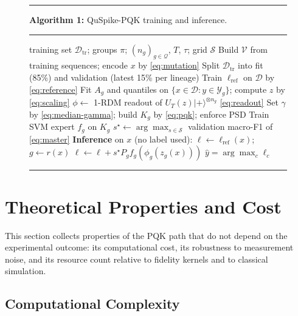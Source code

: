 \documentclass[conference]{IEEEtran}
\begin{document}
\begin{figure}[!t]
    \hrule\smallskip
    \noindent\textbf{Algorithm 1:} QuSpike-PQK training and inference.
    \smallskip\hrule\smallskip
    \footnotesize
    \begin{algorithmic}[1]
        \REQUIRE training set $\mathcal{D}_{\mathrm{tr}}$; groups $\pi$; $(n_g)_{g\in\mathcal{Q}}$, $T$, $\tau$; grid $\mathcal{S}$
        \STATE Build $\mathcal{V}$ from training sequences; encode $x$ by \eqref{eq:mutation}
        \STATE Split $\mathcal{D}_{\mathrm{tr}}$ into fit (85\%) and validation (latest 15\% per lineage)
            \STATE Train $\ell_{\mathrm{ref}}$ on $\mathcal{D}$ by \eqref{eq:reference}
                \STATE Fit $A_g$ and quantiles on $\{x\in\mathcal{D}:y\in\mathcal{Y}_g\}$; compute $z$ by \eqref{eq:scaling}
                \STATE $\phi\leftarrow$ 1-RDM readout of $U_T(z)|{+}\rangle^{\otimes n_g}$ \eqref{eq:readout} 
                \STATE Set $\gamma$ by \eqref{eq:median-gamma}; build $K_g$ by \eqref{eq:pqk}; enforce PSD
                \STATE Train SVM expert $f_g$ on $K_g$
            \ENDFOR
                \STATE $s^{\star}\leftarrow\arg\max_{s\in\mathcal{S}}$ validation macro-F1 of \eqref{eq:master}
            \ENDIF
        \ENDFOR
        \STATE \textbf{Inference} on $x$ (no label used): $\ell\leftarrow\ell_{\mathrm{ref}}(x)$; $g\leftarrow r(x)$
            \STATE $\ell\leftarrow\ell+s^{\star}P_g f_g(\phi_g(z_g(x)))$
        \ENDIF
        \RETURN $\hat{y}=\arg\max_c\ell_c$
    \end{algorithmic}
    \smallskip\hrule
\end{figure}

\section{Theoretical Properties and Cost}
\label{sec:theory}

This section collects properties of the PQK path that do not depend on the experimental outcome: its computational cost, its robustness to measurement noise, and its resource count relative to fidelity kernels and to classical simulation.

\subsection{Computational Complexity}
\label{sec:complexity}
\end{document}
